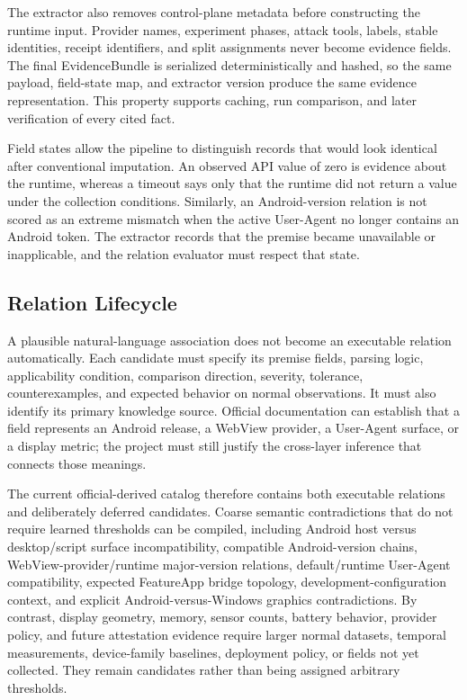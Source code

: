 The extractor also removes control-plane metadata before constructing the runtime input. Provider names, experiment phases, attack tools, labels, stable identities, receipt identifiers, and split assignments never become evidence fields. The final EvidenceBundle is serialized deterministically and hashed, so the same payload, field-state map, and extractor version produce the same evidence representation. This property supports caching, run comparison, and later verification of every cited fact.

Field states allow the pipeline to distinguish records that would look identical after conventional imputation. An observed API value of zero is evidence about the runtime, whereas a timeout says only that the runtime did not return a value under the collection conditions. Similarly, an Android-version relation is not scored as an extreme mismatch when the active User-Agent no longer contains an Android token. The extractor records that the premise became unavailable or inapplicable, and the relation evaluator must respect that state.

\subsection{Relation Lifecycle}

A plausible natural-language association does not become an executable relation automatically. Each candidate must specify its premise fields, parsing logic, applicability condition, comparison direction, severity, tolerance, counterexamples, and expected behavior on normal observations. It must also identify its primary knowledge source. Official documentation can establish that a field represents an Android release, a WebView provider, a User-Agent surface, or a display metric; the project must still justify the cross-layer inference that connects those meanings.

The current official-derived catalog therefore contains both executable relations and deliberately deferred candidates. Coarse semantic contradictions that do not require learned thresholds can be compiled, including Android host versus desktop/script surface incompatibility, compatible Android-version chains, WebView-provider/runtime major-version relations, default/runtime User-Agent compatibility, expected FeatureApp bridge topology, development-configuration context, and explicit Android-versus-Windows graphics contradictions. By contrast, display geometry, memory, sensor counts, battery behavior, provider policy, and future attestation evidence require larger normal datasets, temporal measurements, device-family baselines, deployment policy, or fields not yet collected. They remain candidates rather than being assigned arbitrary thresholds.

